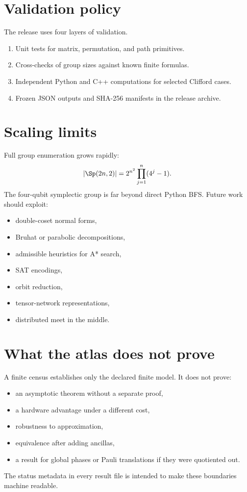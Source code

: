 \section{Validation policy}
The release uses four layers of validation.
\begin{enumerate}
\item Unit tests for matrix, permutation, and path primitives.
\item Cross-checks of group sizes against known finite formulas.
\item Independent Python and C++ computations for selected Clifford cases.
\item Frozen JSON outputs and SHA-256 manifests in the release archive.
\end{enumerate}

\section{Scaling limits}
Full group enumeration grows rapidly:
\[
|\Sp(2n,2)|
=2^{n^2}\prod_{j=1}^n(4^j-1).
\]
The four-qubit symplectic group is far beyond direct Python BFS.  Future work should exploit:
\begin{itemize}
\item double-coset normal forms,
\item Bruhat or parabolic decompositions,
\item admissible heuristics for A* search,
\item SAT encodings,
\item orbit reduction,
\item tensor-network representations,
\item distributed meet in the middle.
\end{itemize}

\section{What the atlas does not prove}
A finite census establishes only the declared finite model.  It does not prove:
\begin{itemize}
\item an asymptotic theorem without a separate proof,
\item a hardware advantage under a different cost,
\item robustness to approximation,
\item equivalence after adding ancillas,
\item a result for global phases or Pauli translations if they were quotiented out.
\end{itemize}
The status metadata in every result file is intended to make these boundaries machine readable.
